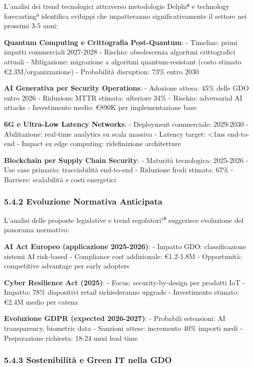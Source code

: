 \documentclass{report}
\begin{document}
L'analisi dei trend tecnologici attraverso metodologie Delphi⁸ e
technology forecasting⁹ identifica sviluppi che impatteranno
significativamente il settore nei prossimi 3-5 anni:

\textbf{Quantum Computing e Crittografia Post-Quantum}: - Timeline:
primi impatti commerciali 2027-2028 - Rischio: obsolescenza algoritmi
crittografici attuali - Mitigazione: migrazione a algoritmi
quantum-resistant (costo stimato €2.3M/organizzazione) - Probabilità
disruption: 73\% entro 2030

\textbf{AI Generativa per Security Operations}: - Adozione attesa: 45\%
delle GDO entro 2026 - Riduzione MTTR stimata: ulteriore 34\% - Rischio:
adversarial AI attacks - Investimento medio: €890K per implementazione
base

\textbf{6G e Ultra-Low Latency Networks}: - Deployment commerciale:
2029-2030 - Abilitazione: real-time analytics su scala massiva - Latency
target: \textless1ms end-to-end - Impact su edge computing:
ridefinizione architetture

\textbf{Blockchain per Supply Chain Security}: - Maturità tecnologica:
2025-2026 - Use case primario: tracciabilità end-to-end - Riduzione
frodi stimata: 67\% - Barriere: scalabilità e costi energetici

\subsubsection{5.4.2 Evoluzione Normativa
Anticipata}\label{evoluzione-normativa-anticipata}

L'analisi delle proposte legislative e trend regolatori¹⁰ suggerisce
evoluzione del panorama normativo:

\textbf{AI Act Europeo (applicazione 2025-2026)}: - Impatto GDO:
classificazione sistemi AI risk-based - Compliance cost addizionale:
€1.2-1.8M - Opportunità: competitive advantage per early adopters

\textbf{Cyber Resilience Act (2025)}: - Focus: security-by-design per
prodotti IoT - Impatto: 78\% dispositivi retail richiederanno upgrade -
Investimento stimato: €2.4M medio per catena

\textbf{Evoluzione GDPR (expected 2026-2027)}: - Probabili estensioni:
AI transparency, biometric data - Sanzioni attese: incremento 40\%
importi medi - Preparazione richiesta: 18-24 mesi lead time

\subsubsection{5.4.3 Sostenibilità e Green IT nella
GDO}\label{sostenibilituxe0-e-green-it-nella-gdo}
\end{document}

